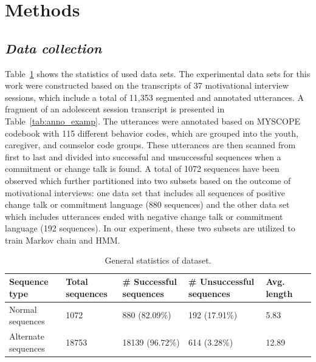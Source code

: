 \documentclass{amia}
\begin{document}
\section*{Methods}
\subsection*{\textit{Data collection}}
Table~\ref{tab:data_dist} shows the statistics of used data sets. The experimental data sets for this work were constructed based on the transcripts of 37 motivational interview sessions, which include a total of 11,353 segmented and annotated utterances. A fragment of an adolescent session transcript is presented in Table~\ref{tab:anno_examp}. The utterances were annotated based on MYSCOPE codebook \cite{carcone2013provider} with 115 different behavior codes, which are grouped into the youth, caregiver, and counselor code groups. These utterances are then scanned from first to last and divided into successful and unsuccessful sequences when a commitment or change talk is found. A total of 1072 sequences have been observed which further partitioned into two subsets based on the outcome of motivational interviews: one data set that includes all sequences of positive change talk or commitment language (880 sequences) and the other data set which includes utterances ended with negative change talk or commitment language (192 sequences). In our experiment, these two subsets are utilized to train Markov chain and HMM. \\

\begin{table}[h]
\centering
\caption{General statistics of dataset.}
\label{tab:data_dist}
  \begin{tabular}{|l|l|l|l|l|l|}
  \hline
   \textbf{Sequence type} & \textbf{Total sequences}  & \textbf{\# Successful sequences}  & \textbf{\# Unsuccessful sequences} & \textbf{Avg. length} \\ \hline      
 Normal sequences & 1072 & 880 (82.09\%) & 192 (17.91\%) & 5.83 \\\hline
Alternate sequences & 18753 & 18139 (96.72\%) & 614 (3.28\%) & 12.89 \\\hline 
  \end{tabular}
\end{table} 
\end{document}
